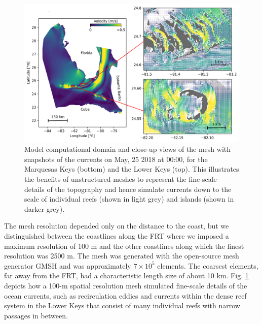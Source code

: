 \documentclass[utf8]{frontiersSCNS}
\begin{document}
\begin{figure}
    \centering
    \includegraphics[width=.95\textwidth]{figures/vel.png}
    \caption{Model computational domain and close-up views of the mesh with snapshots of the currents on May, 25 2018 at 00:00, for the Marquesas Keys (bottom) and the Lower Keys (top). This illustrates the benefits of unstructured meshes to represent the fine-scale details of the topography and hence simulate currents down to the scale of individual reefs (shown in light grey) and islands (shown in darker grey).}
    \label{fig:setup}
\end{figure}

The mesh resolution depended only on the distance to the coast, but we distinguished between the coastlines along the FRT where we imposed a maximum resolution of 100 m and the other coastlines along which the finest resolution was 2500 m. The mesh was generated with the open-source mesh generator GMSH \citep{Geuzaine2009} and was approximately $7 \times 10^5$ elements. The coarsest elements, far away from the FRT, had a characteristic length size of about 10 km. Fig. \ref{fig:setup} depicts how a 100-m spatial resolution mesh simulated fine-scale details of the ocean currents, such as recirculation eddies and currents within the dense reef system in the Lower Keys that consist of many individual reefs with narrow passages in between. 
\end{document}
